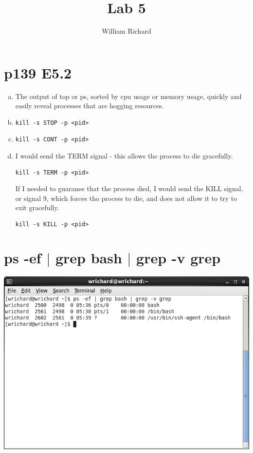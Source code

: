 \documentclass[a4paper,10pt]{article}
\title{Lab 5}
\author{William Richard}
\begin{document}
\maketitle

\section{p139 E5.2}
\begin{enumerate}[(a)]
  \item The output of top or ps, sorted by cpu usage or memory usage, quickly and easily reveal processes that are hogging resources.
  \item 
\begin{verbatim}
kill -s STOP -p <pid>
\end{verbatim}
  \item 
\begin{verbatim}
kill -s CONT -p <pid>
\end{verbatim}
  \item I would send the TERM signal - this allows the process to die gracefully.
\begin{verbatim}
kill -s TERM -p <pid>
\end{verbatim}
If I needed to guaranee that the process died, I would send the KILL signal, or signal 9, which forces tho process to die, and does not allow it to try to exit gracefully.
\begin{verbatim}
kill -s KILL -p <pid>
\end{verbatim}
\end{enumerate}

\section{ps -ef $|$ grep bash $|$ grep -v grep}
  \begin{center}
  \includegraphics[width=\linewidth]{./grepbash.png}
  \end{center}
\end{document}
